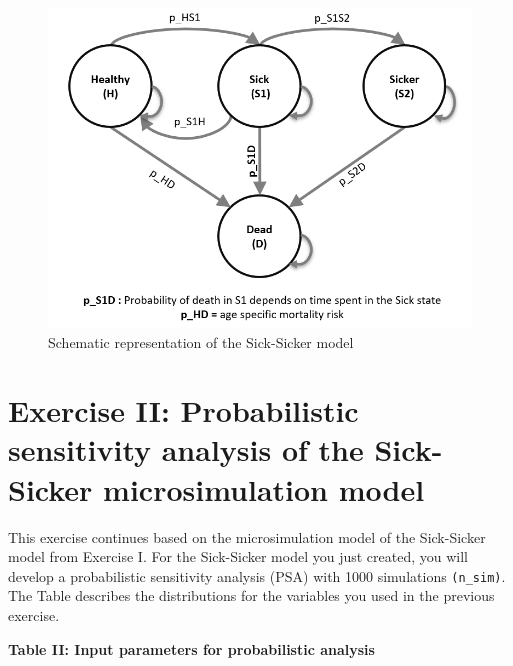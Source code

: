 \documentclass[
]{article}
\begin{document}
\begin{figure}

{\centering \includegraphics[width=1\linewidth]{sick_sicker_diagram_time} 

}

\caption{Schematic representation of the Sick-Sicker model}\label{fig:unnamed-chunk-1}
\end{figure}

\newpage

\hypertarget{exercise-ii-probabilistic-sensitivity-analysis-of-the-sick-sicker-microsimulation-model}{%
\section{Exercise II: Probabilistic sensitivity analysis of the
Sick-Sicker microsimulation
model}\label{exercise-ii-probabilistic-sensitivity-analysis-of-the-sick-sicker-microsimulation-model}}

This exercise continues based on the microsimulation model of the
Sick-Sicker model from Exercise I. For the Sick-Sicker model you just
created, you will develop a probabilistic sensitivity analysis (PSA)
with 1000 simulations \texttt{(n\_sim)}. The Table describes the
distributions for the variables you used in the previous exercise.

\textbf{Table II: Input parameters for probabilistic analysis}
\end{document}
